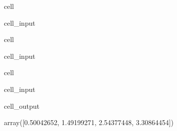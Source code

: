 \documentclass[letterpaper,10pt,english]{jupyterBook}
\begin{document}
\begin{sphinxuseclass}{cell}\begin{sphinxVerbatimInput}

\begin{sphinxuseclass}{cell_input}
\begin{sphinxVerbatim}[commandchars=\\\{\}]
  
\end{sphinxVerbatim}

\end{sphinxuseclass}\end{sphinxVerbatimInput}

\end{sphinxuseclass}
\begin{sphinxuseclass}{cell}\begin{sphinxVerbatimInput}

\begin{sphinxuseclass}{cell_input}
\begin{sphinxVerbatim}[commandchars=\\\{\}]
 
     
\end{sphinxVerbatim}

\end{sphinxuseclass}\end{sphinxVerbatimInput}

\end{sphinxuseclass}
\begin{sphinxuseclass}{cell}\begin{sphinxVerbatimInput}

\begin{sphinxuseclass}{cell_input}
\begin{sphinxVerbatim}[commandchars=\\\{\}]
  
   
\PYG{p}{[}\PYG{p}{]}
\end{sphinxVerbatim}

\end{sphinxuseclass}\end{sphinxVerbatimInput}
\begin{sphinxVerbatimOutput}

\begin{sphinxuseclass}{cell_output}
\begin{sphinxVerbatim}[commandchars=\\\{\}]
array([0.50042652, 1.49199271, 2.54377448, 3.30864454])
\end{sphinxVerbatim}

\end{sphinxuseclass}\end{sphinxVerbatimOutput}

\end{sphinxuseclass}
\end{document}
